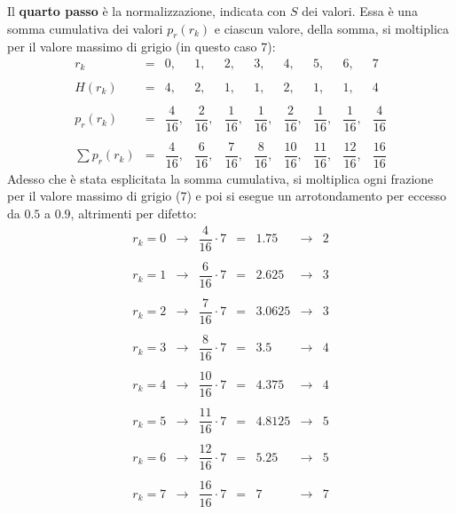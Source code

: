\documentclass[a4paper]{article}
\begin{document}
	\noindent
	Il \textbf{quarto passo} è la normalizzazione, indicata con $S$ dei valori. Essa è una somma cumulativa dei valori $p_{r}\left(r_{k}\right)$ e ciascun valore, della somma, si moltiplica per il valore massimo di grigio (in questo caso $7$):
	\begin{equation*}
		\begin{array}{rccccccccc}
			r_{k} 						& = & 0,& 1,& 2,& 3,& 4,& 5,& 6,& 7 \\
			\\
			H\left(r_{k}\right) 		& = & 4,& 2,& 1,& 1,& 2,& 1,& 1,& 4 \\
			\\
			p_{r}\left(r_{k}\right) 	& = & \dfrac{4}{16},& \dfrac{2}{16},& \dfrac{1}{16},& \dfrac{1}{16},& \dfrac{2}{16},& \dfrac{1}{16},& \dfrac{1}{16},& \dfrac{4}{16} \\
			\\
			\sum p_{r}\left(r_{k}\right)& = & \dfrac{4}{16},& \dfrac{6}{16},& \dfrac{7}{16},& \dfrac{8}{16},& \dfrac{10}{16},& \dfrac{11}{16},& \dfrac{12}{16},& \dfrac{16}{16}
		\end{array}
	\end{equation*}
	Adesso che è stata esplicitata la somma cumulativa, si moltiplica ogni frazione per il valore massimo di grigio ($7$) e poi si esegue un arrotondamento per eccesso da $0.5$ a $0.9$, altrimenti per difetto:
	\begin{equation*}
		\begin{array}{lllllll}
			r_{k} = 0 & \longrightarrow & \dfrac{4}{16} \cdot 7 & = & 1.75 & \longrightarrow & 2 \\
			\\
			r_{k} = 1 & \longrightarrow & \dfrac{6}{16} \cdot 7 & = & 2.625 & \longrightarrow & 3 \\
			\\
			r_{k} = 2 & \longrightarrow & \dfrac{7}{16} \cdot 7 & = & 3.0625 & \longrightarrow & 3 \\
			\\
			r_{k} = 3 & \longrightarrow & \dfrac{8}{16} \cdot 7 & = & 3.5 & \longrightarrow & 4 \\
			\\
			r_{k} = 4 & \longrightarrow & \dfrac{10}{16} \cdot 7 & = & 4.375 & \longrightarrow & 4 \\
			\\
			r_{k} = 5 & \longrightarrow & \dfrac{11}{16} \cdot 7 & = & 4.8125 & \longrightarrow & 5 \\
			\\
			r_{k} = 6 & \longrightarrow & \dfrac{12}{16} \cdot 7 & = & 5.25 & \longrightarrow & 5 \\
			\\
			r_{k} = 7 & \longrightarrow & \dfrac{16}{16} \cdot 7 & = & 7 & \longrightarrow & 7
		\end{array}
	\end{equation*}\newline
\end{document}
